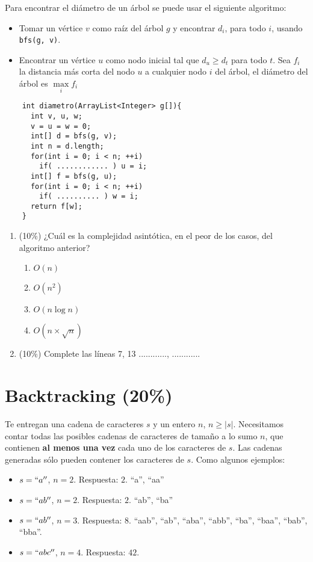 \documentclass[10 pt]{article}
\begin{document}
\begin{multicols}{2}
	Para encontrar el diámetro de un árbol se puede usar el siguiente algoritmo:
	\begin{itemize}
		\item Tomar un vértice $v$ como raíz del árbol $g$ y encontrar $d_i$, para todo $i$, usando \texttt{bfs(g, v)}.
		\item Encontrar un vértice $u$ como nodo inicial tal que $d_u \geq d_t$ para todo $t$. Sea $f_i$ la distancia más corta del nodo $u$ a cualquier nodo $i$ del árbol, el diámetro del árbol es $\max\limits_i{f_i}$
	\end{itemize}
	{\footnotesize
	\begin{lstlisting}
	int diametro(ArrayList<Integer> g[]){
	  int v, u, w;
	  v = u = w = 0;
	  int[] d = bfs(g, v);
	  int n = d.length;
	  for(int i = 0; i < n; ++i)
	    if( ............ ) u = i;
	  int[] f = bfs(g, u);
	  for(int i = 0; i < n; ++i)
	    if( .......... ) w = i;
	  return f[w];
	}
	\end{lstlisting}
	}
	\begin{enumerate}[label=\alph*]
		\item (10\%) ¿Cuál es la complejidad asintótica, en el peor de los casos, del algoritmo anterior?
		\begin{enumerate}[label=\roman*]
			\item $O(n)$
			\item $O(n^2)$
			\item $O(n \log n)$
			\item $O(n \times \sqrt{n})$
		\end{enumerate}
		\item (10\%) Complete las líneas 7, 13 ............, ............
	\end{enumerate}



	\section{Backtracking (20\%)}
	Te entregan una cadena de caracteres $s$ y un entero $n$, $n \geq |s|$. Necesitamos contar todas las posibles cadenas de caracteres de tamaño a lo sumo $n$, que contienen \textbf{al menos una vez} cada uno de los caracteres de $s$. Las cadenas generadas sólo pueden contener los caracteres de $s$. Como algunos ejemplos: 
	{\footnotesize
	\begin{itemize}[noitemsep]
		\item $s = ``a''$, $n = 2$. Respuesta: $2$. ``a'', ``aa''
		\item $s = ``ab''$, $n = 2$. Respuesta: $2$.  ``ab'', ``ba''
		\item $s = ``ab''$, $n = 3$. Respuesta: $8$.  ``aab'', ``ab'', ``aba'', ``abb'', ``ba'', ``baa'', ``bab'', ``bba''.
		\item $s = ``abc''$, $n = 4$. Respuesta: $42$.
	\end{itemize}

}
\end{multicols}
\end{document}

